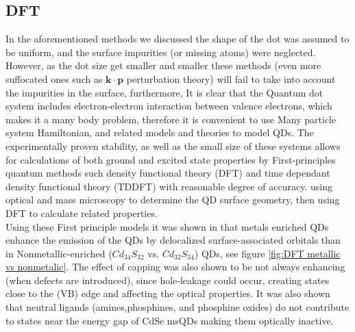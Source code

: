 \documentclass[twoside,11pt]{article}
\begin{document}
    \subsection{DFT}
    In the aforementioned methods we discussed the shape of the dot was assumed to be uniform, and the surface impurities (or missing atoms) were neglected. However, as the dot size get smaller and smaller these methods (even more suffocated ones such as $\mathbf{k\cdot p}$ perturbation theory) will fail to take into account the impurities in the surface, furthermore,  It is clear that the Quantum dot system includes electron-electron interaction between valence electrons, which makes it a many body problem, therefore it is convenient to use Many particle system Hamiltonian, and related models and theories to model QDs. The experimentally proven stability, as well as the small size of these systems allows for calculations of both ground and
    excited state properties by First-principles quantum methods such density functional theory (DFT) and time dependant density functional theory (TDDFT) with reasonable degree of accuracy. using optical and mass microscopy to determine the QD surface geometry, then using DFT to calculate related properties.\\
    Using these First principle models it was shown in \cite{kilina2016surface} that metals enriched QDs enhance the emission of the QDs by delocalized surface-associated orbitals than in Nonmetallic-enriched ($Cd_{34}S_{32}$ vs. $Cd_{32}S_{34}$) QDs, see figure \ref{fig:DFT metallic vs nonmetalic}.
    The effect of capping was also shown to be not always enhancing (when defects are introduced), since hole-leakage could occur, creating states close to the (VB) edge and affecting the optical properties. It was also shown that neutral ligands (amines,phosphines, and phosphine oxides) do not contribute to states near the energy gap of CdSe msQDs making them optically inactive.
\end{document}
